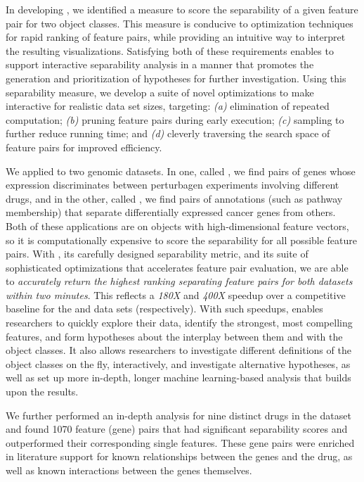 In developing \genviz,
we identified a measure to score the separability
of a given feature pair for two object classes.
This measure is conducive to
optimization techniques for rapid ranking of feature
pairs, while providing an intuitive way
to interpret
the resulting visualizations.
Satisfying both of these requirements
enables \genviz to support interactive separability analysis
in a manner that promotes the generation and prioritization
of hypotheses for further investigation.
Using this separability measure, we develop a suite of novel
optimizations to make \genviz interactive for realistic data set sizes,
targeting: {\em (a)} elimination of repeated computation;
{\em (b)} pruning feature pairs during early execution;
{\em (c)} sampling to further reduce running time;
and {\em (d)} cleverly traversing the search space
of feature pairs for improved efficiency.

We applied \genviz to two genomic datasets.
In one, called \lincs, we find pairs of genes
whose expression discriminates between perturbagen experiments
involving different drugs, and in the other, called \msig,
we find pairs of annotations (such as pathway membership)
that separate differentially expressed
cancer genes from others.
Both of these applications are on
objects with high-dimensional feature vectors,
so it is computationally expensive to score the separability
for all possible feature pairs.
With \genviz, its carefully designed
separability metric,
and its suite of sophisticated optimizations
that accelerates feature pair evaluation,
we are able to {\emph{accurately return the
highest ranking separating
feature pairs for both datasets within two minutes}}.
This reflects a \emph{180X} and \emph{400X} speedup
over a competitive baseline for the \msig and \lincs data sets (respectively).
With such speedups, \genviz enables researchers to quickly explore their data,
identify the strongest, most compelling features,
and form hypotheses about the interplay between them and with the object classes.
It also allows researchers to investigate different definitions
of the object classes on the fly, interactively,
and investigate alternative hypotheses,
as well as set up more in-depth,
longer machine learning-based analysis
that builds upon the \genviz results.

We further performed an in-depth analysis
for nine distinct drugs in the \lincs dataset and
found 1070 feature (gene) pairs that had significant separability scores and outperformed
their corresponding single features. These gene pairs were enriched
in literature support for known relationships between the genes and the drug,
as well as known interactions between the genes themselves.

